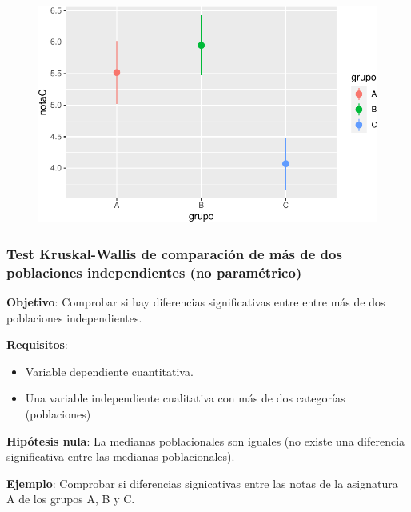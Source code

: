 \documentclass[
  a4paper,
]{scrreport}
\providecommand{\tightlist}{%
  \setlength{\itemsep}{0pt}\setlength{\parskip}{0pt}}\usepackage{longtable,booktabs,array}
\theoremstyle{definition}
\theoremstyle{definition}
\theoremstyle{remark}
\begin{document}
\begin{figure}[H]

{\centering \includegraphics{08-analisis-estadisticos_files/figure-pdf/unnamed-chunk-54-1.pdf}

}

\end{figure}

\hypertarget{test-kruskal-wallis-de-comparaciuxf3n-de-muxe1s-de-dos-poblaciones-independientes-no-paramuxe9trico}{%
\subsubsection{Test Kruskal-Wallis de comparación de más de dos
poblaciones independientes (no
paramétrico)}\label{test-kruskal-wallis-de-comparaciuxf3n-de-muxe1s-de-dos-poblaciones-independientes-no-paramuxe9trico}}

\textbf{Objetivo}: Comprobar si hay diferencias significativas entre
entre más de dos poblaciones independientes.

\textbf{Requisitos}:

\begin{itemize}
\tightlist
\item
  Variable dependiente cuantitativa.
\item
  Una variable independiente cualitativa con más de dos categorías
  (poblaciones)
\end{itemize}

\textbf{Hipótesis nula}: La medianas poblacionales son iguales (no
existe una diferencia significativa entre las medianas poblacionales).

\textbf{Ejemplo}: Comprobar si diferencias signicativas entre las notas
de la asignatura A de los grupos A, B y C.
\end{document}
